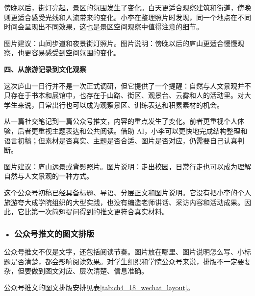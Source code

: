 \begin{aibox}
傍晚以后，街灯亮起，景区的氛围发生了变化。白天更适合观察建筑和街道，傍晚则更适合感受光线和人流带来的变化。小李在整理照片时发现，同一个地点在不同时间会呈现出不同效果，这也是景区空间观察中值得注意的细节。

图片建议：山间步道和夜景街灯照片。图片说明：傍晚以后的庐山更适合慢慢观察，也更容易感受到空间氛围的变化。

\textbf{四、从旅游记录到文化观察}

这次庐山一日行并不是一次正式调研，但它提供了一个提醒：自然与人文景观并不只存在于书本和展馆中，也存在于山路、街区、观景台、云雾和人的活动里。对大学生来说，日常出行也可以成为观察景区、训练表达和积累素材的机会。

从一篇社交笔记到一篇公众号推文，内容的重点发生了变化。前者更重视个人体验，后者更重视主题表达和公共阅读。借助 AI，小李可以更快地完成结构整理和语言初稿；但素材是否真实、主题是否合适、图片是否对应，仍需要自己认真判断。

图片建议：庐山远景或背影照片。图片说明：走出校园，日常行走也可以成为理解自然与人文景观的一种方式。
\end{aibox}

这个公众号初稿已经具备标题、导语、分层正文和图片说明。它没有把小李的个人旅游夸大成学院组织的大型实践，也没有编造老师讲话、采访内容和活动成果。因此，它比第一次简短提问得到的推文更符合真实材料。

\subsubsection*{\textbf{• 公众号推文的图文排版}}

公众号推文不仅是文字，还包括阅读节奏。图片放在哪里、图片说明怎么写、小标题是否清楚，都会影响阅读效果。对学生组织和学院公众号来说，排版不一定要复杂，但要做到图文对应、层次清楚、信息准确。


公众号推文的图文排版安排见表\ref{tab:ch4_18_wechat_layout}。

